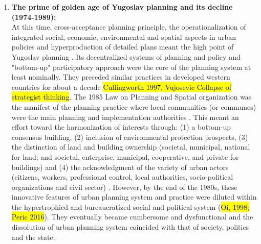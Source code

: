 \documentclass[11pt]{report}
\begin{document}
\begin{enumerate}
The decentralizing political and economic measures\footnote{Strengthening the role of the Federal units and semi-market economic system} contributed to the introduction of integrated and comprehensive planning in Yugoslav context. Its main achievements are:
(1) the administrative hierarchy  and the distribution of plans,
(2) interdisciplinary planning practice,
(3) increased public participation, and
(4) social approach through the mass provision of affordable housing \cite{Vesna Cagic 2014, Peric 2016}. This model was introduced as the ‘Basic Policy on Urbanism and Spatial Ordering’ and passed by the State Parliament in 1971 \cite{waves of planning 2006}.
Namely, Yugoslav planning system was internationally acknowledged as significantly decentralized and multidisciplinary with strong tendencies to include and balance spatial, social, economic, and environmental principles (\hl{Simmie, 1989; Miodrag Vujosevic, 2003, Peric 2016}).

\item \textbf{The prime of golden age of Yugoslav planning and its decline (1974-1989):}
\\
At this time, cross-acceptance planning principle, the operationalization of integrated social, economic, environmental and spatial aspects in urban policies and hyperproduction of detailed plans meant the high point of Yugoslav planning \cite{Mornings after Nedovic Budic}.
Its decentralized systems of planning and policy and "bottom-up" participatory approach were the core of the planning system at least nominally. They preceded similar practices in developed western countries for about a decade \hl{Cullingworth 1997, Vujosevic Collapse of strategist thinking}.
The 1985 Law on Planning and Spatial organization was the manifest of the planning practice where local communities (or communes) were the main planning and implementation authorities \cite{(Vujosevic and Nedovic 2006)}. This meant an effort toward the harmonization of interests through:
(1) a bottom-up consensus building,
(2) inclusion of environmental protection prospects,
(3) the distinction of land and building ownership (societal, municipal, national for land; and societal, enterprise, municipal, cooperative, and private for buildings) and
(4) the acknowledgment of the variety of urban actors (citizens, workers, professional control, local authorities, socio-political organizations and civil sector) \cite{adjustment of planning practice nedovic budic 2001}.
However, by the end of the 1980s, these innovative features of urban planning system and practice were diluted within the hypertrophied and bureaucratized social and political system (\hl{Oi, 1998; Peric 2016}). They eventually became cumbersome and dysfunctional and the dissolution of urban planning system coincided with that of society, politics and the state.
\end{enumerate}
\end{document}
